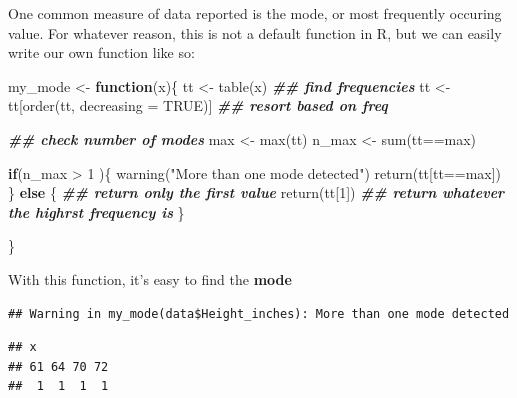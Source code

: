 \documentclass[
]{book}
\newenvironment{Shaded}{\begin{snugshade}}{\end{snugshade}}
\newcommand{\AttributeTok}[1]{\textcolor[rgb]{0.77,0.63,0.00}{#1}}
\newcommand{\ConstantTok}[1]{\textcolor[rgb]{0.00,0.00,0.00}{#1}}
\newcommand{\ControlFlowTok}[1]{\textcolor[rgb]{0.13,0.29,0.53}{\textbf{#1}}}
\newcommand{\DecValTok}[1]{\textcolor[rgb]{0.00,0.00,0.81}{#1}}
\newcommand{\DocumentationTok}[1]{\textcolor[rgb]{0.56,0.35,0.01}{\textbf{\textit{#1}}}}
\newcommand{\FunctionTok}[1]{\textcolor[rgb]{0.00,0.00,0.00}{#1}}
\newcommand{\NormalTok}[1]{#1}
\newcommand{\OtherTok}[1]{\textcolor[rgb]{0.56,0.35,0.01}{#1}}
\newcommand{\SpecialCharTok}[1]{\textcolor[rgb]{0.00,0.00,0.00}{#1}}
\newcommand{\StringTok}[1]{\textcolor[rgb]{0.31,0.60,0.02}{#1}}
\begin{document}
One common measure of data reported is the mode, or most frequently occuring value. For whatever reason, this is not a default function in R, but we can easily write our own function like so:

\begin{Shaded}
\begin{Highlighting}[]
\NormalTok{my\_mode }\OtherTok{\textless{}{-}} \ControlFlowTok{function}\NormalTok{(x)\{}
\NormalTok{  tt }\OtherTok{\textless{}{-}} \FunctionTok{table}\NormalTok{(x) }\DocumentationTok{\#\# find frequencies}
\NormalTok{  tt }\OtherTok{\textless{}{-}}\NormalTok{ tt[}\FunctionTok{order}\NormalTok{(tt, }\AttributeTok{decreasing =} \ConstantTok{TRUE}\NormalTok{)] }\DocumentationTok{\#\# resort based on freq}
  
  \DocumentationTok{\#\# check number of modes}
\NormalTok{  max }\OtherTok{\textless{}{-}} \FunctionTok{max}\NormalTok{(tt)}
\NormalTok{  n\_max }\OtherTok{\textless{}{-}} \FunctionTok{sum}\NormalTok{(tt}\SpecialCharTok{==}\NormalTok{max)}
  
  
  \ControlFlowTok{if}\NormalTok{(n\_max }\SpecialCharTok{\textgreater{}} \DecValTok{1}\NormalTok{ )\{}
    \FunctionTok{warning}\NormalTok{(}\StringTok{"More than one mode detected"}\NormalTok{)}
    \FunctionTok{return}\NormalTok{(tt[tt}\SpecialCharTok{==}\NormalTok{max])}
\NormalTok{  \} }\ControlFlowTok{else}\NormalTok{ \{}
    \DocumentationTok{\#\# return only the first value}
    \FunctionTok{return}\NormalTok{(tt[}\DecValTok{1}\NormalTok{]) }\DocumentationTok{\#\# return whatever the highrst frequency is}
\NormalTok{  \}}

  
\NormalTok{\}}
\end{Highlighting}
\end{Shaded}

With this function, it's easy to find the \textbf{mode}

\begin{Shaded}
\end{Shaded}

\begin{verbatim}
## Warning in my_mode(data$Height_inches): More than one mode detected
\end{verbatim}

\begin{verbatim}
## x
## 61 64 70 72 
##  1  1  1  1
\end{verbatim}
\end{document}
